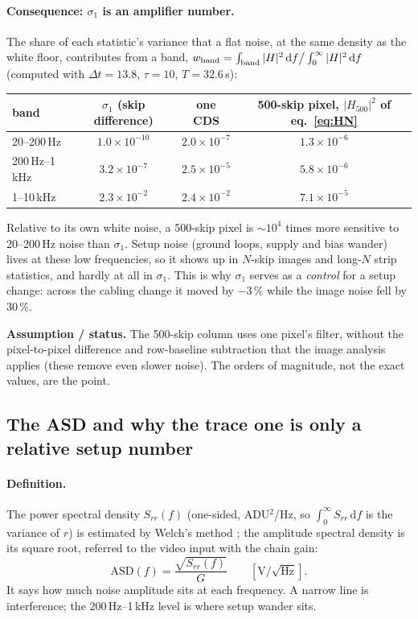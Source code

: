 \documentclass[10pt,a4paper]{article}
\newcommand{\dd}{\,\mathrm{d}}
\newcommand{\caveat}[1]{\par\smallskip\noindent\colorbox{orange!10}{\parbox{\dimexpr\linewidth-2\fboxsep}{\small\textbf{Assumption / status.} #1}}\par\smallskip}
\begin{document}
\paragraph{Consequence: $\sigma_1$ is an amplifier number.} The share of each statistic's variance that a flat noise,
at the same density as the white floor, contributes from a band,
$w_{\rm band}=\int_{\rm band}|H|^2\dd f\big/\int_0^\infty|H|^2\dd f$ (computed with $\Delta t=13.8$, $\tau=10$,
$T=32.6$\,\textmu s):
\begin{center}\small
\begin{tabular}{lccc}\toprule
band & $\sigma_1$ (skip difference) & one CDS & 500-skip pixel, $|H_{500}|^2$ of eq.~\eqref{eq:HN}\\\midrule
20--200\,Hz & $1.0\times10^{-10}$ & $2.0\times10^{-7}$ & $1.3\times10^{-6}$\\
200\,Hz--1\,kHz & $3.2\times10^{-7}$ & $2.5\times10^{-5}$ & $5.8\times10^{-6}$\\
1--10\,kHz & $2.3\times10^{-2}$ & $2.4\times10^{-2}$ & $7.1\times10^{-5}$\\\bottomrule
\end{tabular}
\end{center}
Relative to its own white noise, a 500-skip pixel is $\sim10^4$ times more sensitive to 20--200\,Hz noise than
$\sigma_1$. Setup noise (ground loops, supply and bias wander) lives at these low frequencies, so it shows up in
$N$-skip images and long-$N$ strip statistics, and hardly at all in $\sigma_1$. This is why $\sigma_1$ serves as a
\emph{control} for a setup change: across the cabling change it moved by $-3\,\%$ while the image noise fell by 30\,\%.
\caveat{The 500-skip column uses one pixel's filter, without the pixel-to-pixel difference and row-baseline subtraction
that the image analysis applies (these remove even slower noise). The orders of magnitude, not the exact values, are
the point.}

\subsection{The ASD and why the trace one is only a relative setup number}

\paragraph{Definition.} The power spectral density $S_{rr}(f)$ (one-sided, ADU$^2$/Hz, so $\int_0^\infty S_{rr}\dd f$
is the variance of $r$) is estimated by Welch's method \cite{welch1967}; the amplitude spectral density is its square root, referred to
the video input with the chain gain:
\begin{equation}
\text{ASD}(f)=\frac{\sqrt{S_{rr}(f)}}{G}\qquad[\text{V}/\sqrt{\text{Hz}}].
\end{equation}
It says how much noise amplitude sits at each frequency. A narrow line is interference; the 200\,Hz--1\,kHz level is
where setup wander sits.
\end{document}
